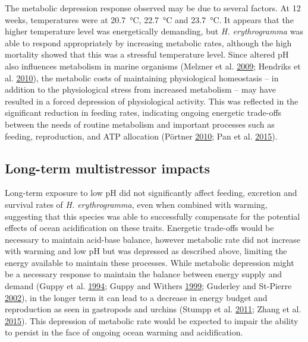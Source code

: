\documentclass[a4paper,10pt, oneside]{memoir}
\begin{document}
The metabolic depression response observed may be due to several factors. At 12 weeks, temperatures were at \SI{20.7}{\celsius}, \SI{22.7}{\celsius} and \SI{23.7}{\celsius}.
It appears that the higher temperature level was energetically demanding, but \textit{H. erythrogramma} was able to respond appropriately by increasing metabolic rates, although the high mortality showed that this was a stressful temperature level.
Since altered pH also influences metabolism in marine organisms (Melzner et al. \protect\hyperlink{ref-Melzner2009}{2009}; Hendriks et al. \protect\hyperlink{ref-Hendriks2010}{2010}), the metabolic costs of maintaining physiological homeostasis -- in addition to the physiological stress from increased metabolism -- may have resulted in a forced depression of physiological activity.
This was reflected in the significant reduction in feeding rates, indicating ongoing energetic trade-offs between the needs of routine metabolism and important processes such as feeding, reproduction, and ATP allocation (Pörtner \protect\hyperlink{ref-Portner2010}{2010}; Pan et al. \protect\hyperlink{ref-Pan2015}{2015}).

\hypertarget{long-term-multistressor-impacts}{%
\subsection{Long-term multistressor impacts}\label{long-term-multistressor-impacts}}

Long-term exposure to low pH did not significantly affect feeding, excretion and survival rates of \textit{H. erythrogramma}, even when combined with warming, suggesting that this species was able to successfully compensate for the potential effects of ocean acidification on these traits.
Energetic trade-offs would be necessary to maintain acid-base balance, however metabolic rate did not increase with warming and low pH but was depressed as described above, limiting the energy available to maintain these processes.
While metabolic depression might be a necessary response to maintain the balance between energy supply and demand (Guppy et al. \protect\hyperlink{ref-Guppy1994}{1994}; Guppy and Withers \protect\hyperlink{ref-Guppy1999}{1999}; Guderley and St-Pierre \protect\hyperlink{ref-Guderley2002}{2002}), in the longer term it can lead to a decrease in energy budget and reproduction as seen in gastropods and urchins (Stumpp et al. \protect\hyperlink{ref-Stumpp2011}{2011}; Zhang et al. \protect\hyperlink{ref-Zhang2015}{2015}).
This depression of metabolic rate would be expected to impair the ability to persist in the face of ongoing ocean warming and acidification.
\end{document}
